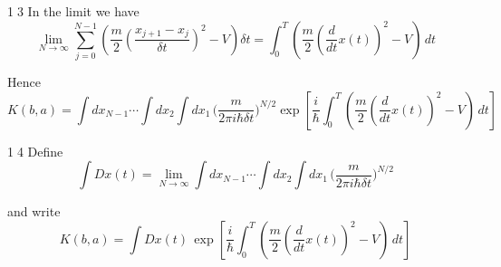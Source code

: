 \documentclass[12pt]{article}
\begin{document}
\textcircled{\scriptsize13}
In the limit we have
\begin{equation*}
\lim_{N\rightarrow\infty}
\sum_{j=0}^{N-1}
\left(
\frac{m}{2}\left(\frac{x_{j+1}-x_j}{\delta t}\right)^2-V
\right)\delta t
=
\int_0^T
\left(
\frac{m}{2}\left(\frac{d}{dt}x(t)\right)^2-V
\right)\,dt
\end{equation*}

Hence
\begin{equation*}
K(b,a)=\int dx_{N-1}\cdots\int dx_2\int dx_1\,
\biggl(\frac{m}{2\pi i\hbar\delta t}\biggr)^{N/2}
\exp\left[
\frac{i}{\hbar}
\int_0^T
\left(
\frac{m}{2}\left(\frac{d}{dt}x(t)\right)^2-V
\right)
\,dt
\right]
\end{equation*}

\textcircled{\scriptsize14}
Define
\begin{equation*}
\int Dx(t)=\lim_{N\rightarrow\infty}
\int dx_{N-1}\cdots\int dx_2\int dx_1\,
\biggl(\frac{m}{2\pi i\hbar\delta t}\biggr)^{N/2}
\end{equation*}

and write
\begin{equation*}
K(b,a)=\int Dx(t)\,
\exp\left[
\frac{i}{\hbar}
\int_0^T
\left(
\frac{m}{2}\left(\frac{d}{dt}x(t)\right)^2-V
\right)
\,dt
\right]
\end{equation*}
\end{document}
